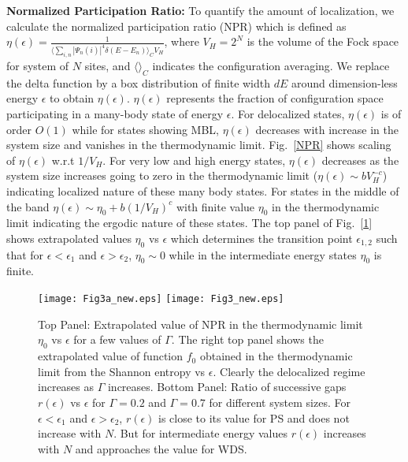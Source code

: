 \documentclass[prl,aps,twocolumn,floats,nofootinbib]{revtex4}
\begin{document}
{\bf{ Normalized Participation Ratio:}} To quantify the amount of localization, we calculate the normalized participation ratio (NPR) which is defined as
$\eta(\epsilon) = \frac{1}{\langle \sum_{i,n} |\Psi_n(i)|^4 \delta(E-E_n) \rangle_C V_H}$, 
where $V_H=2^N$ is the volume of the Fock space for system of $N$ sites, and $\langle \rangle _C$ indicates the configuration averaging.  We replace the delta function by a box distribution of finite width $d E$ around dimension-less energy $\epsilon$ to obtain $\eta(\epsilon)$. $\eta(\epsilon)$ represents the fraction of configuration space participating in a many-body state of energy $\epsilon$. For delocalized states, $\eta(\epsilon)$ is of order $O(1)$ while for states showing MBL, $\eta(\epsilon)$ decreases with increase in the system size and vanishes in the thermodynamic limit.
Fig.~\ref{NPR} shows scaling of $\eta(\epsilon)$ w.r.t $1/V_H$. For very low and high energy states, $\eta(\epsilon)$ decreases as the system size increases going to zero in the thermodynamic limit ($\eta(\epsilon)\sim bV_H^{-c}$) indicating localized nature of these many body states. For states in the middle of the band $\eta(\epsilon) \sim \eta_0+b(1/V_H)^c$ with finite value $\eta_0$ in the thermodynamic limit indicating the ergodic nature of these states. The top panel of Fig.~[\ref{r}] shows extrapolated values $\eta_0$ vs $\epsilon$ which determines the transition point $\epsilon_{1,2}$ such that for $\epsilon<\epsilon_1$ and $\epsilon > \epsilon_2$, $\eta_0 \sim 0$ while in the intermediate energy states $\eta_0$ is finite. 

\begin{figure}[h!]
\begin{center}
\hskip-0.8cm
\vskip-1.3cm
\texttt{[image: Fig3a\_new.eps]}
\vskip-3cm
\texttt{[image: Fig3\_new.eps]}
\vskip-1.5cm
\caption{Top Panel: Extrapolated value of NPR in the thermodynamic limit $\eta_0$ vs $\epsilon$ for a few values of $\Gamma$. The right top panel shows the extrapolated value of function $f_0$ obtained in the thermodynamic limit from the Shannon entropy vs $\epsilon$. Clearly the delocalized regime increases as $\Gamma$ increases. Bottom Panel: Ratio of successive gaps $r(\epsilon)$ vs $\epsilon$ for $\Gamma=0.2$ and $\Gamma=0.7$ for different system sizes. For $\epsilon < \epsilon_1$ and $\epsilon >\epsilon_2$, $r(\epsilon)$ is close to its value for PS and does not increase with $N$. But for intermediate energy values $r(\epsilon)$ increases with $N$ and approaches the value for WDS.}
\vskip-0.5cm
\label{r}
\end{center}
\end{figure}
\end{document}
